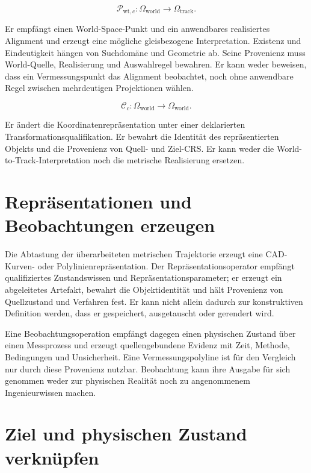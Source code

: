 \begin{definition}
\label{def:world-to-track-operator}
\[
\mathcal P_{\mathrm{wt},c}:
\Omega_{\mathrm{world}}\rightarrow\Omega_{\mathrm{track}}.
\]
\end{definition}

Er empfängt einen World-Space-Punkt und ein anwendbares realisiertes Alignment
und erzeugt eine mögliche gleisbezogene Interpretation. Existenz und
Eindeutigkeit hängen von Suchdomäne und Geometrie ab. Seine Provenienz muss
World-Quelle, Realisierung und Auswahlregel bewahren. Er kann weder beweisen,
dass ein Vermessungspunkt das Alignment beobachtet, noch ohne anwendbare Regel
zwischen mehrdeutigen Projektionen wählen.

\begin{definition}[Koordinatentransformationsoperator]
\label{def:coordinate-transform-operator}
\[
\mathcal C_c:
\Omega_{\mathrm{world}}\rightarrow\Omega_{\mathrm{world}}.
\]
\end{definition}

Er ändert die Koordinatenrepräsentation unter einer deklarierten
Transformationsqualifikation. Er bewahrt die Identität des repräsentierten
Objekts und die Provenienz von Quell- und Ziel-CRS. Er kann weder die
World-to-Track-Interpretation noch die metrische Realisierung ersetzen.

\section{Repräsentationen und Beobachtungen erzeugen}

Die Abtastung der überarbeiteten metrischen Trajektorie erzeugt eine
CAD-Kurven- oder Polylinienrepräsentation. Der Repräsentationsoperator
empfängt qualifiziertes Zustandswissen und Repräsentationsparameter; er
erzeugt ein abgeleitetes Artefakt, bewahrt die Objektidentität und hält
Provenienz von Quellzustand und Verfahren fest. Er kann nicht allein dadurch
zur konstruktiven Definition werden, dass er gespeichert, ausgetauscht oder
gerendert wird.

Eine Beobachtungsoperation empfängt dagegen einen physischen Zustand über
einen Messprozess und erzeugt quellengebundene Evidenz mit Zeit, Methode,
Bedingungen und Unsicherheit. Eine Vermessungspolyline ist für den Vergleich
nur durch diese Provenienz nutzbar. Beobachtung kann ihre Ausgabe für sich
genommen weder zur physischen Realität noch zu angenommenem Ingenieurwissen
machen.

\section{Ziel und physischen Zustand verknüpfen}

